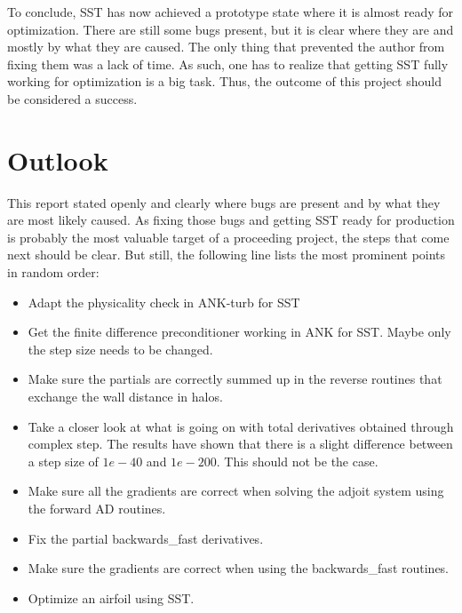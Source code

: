 To conclude, SST has now achieved a prototype state where it is almost ready
for optimization. There are still some bugs present, but it is clear where they
are and mostly by what they are caused. The only thing that prevented the
author from fixing them was a lack of time. As such, one has to realize that
getting SST fully working for optimization is a big task. Thus, the outcome of
this project should be considered a success.



\section{Outlook}
This report stated openly and clearly where bugs are present and by what they
are most likely caused. As fixing those bugs and getting SST ready for
production is probably the most valuable target of a proceeding project, the
steps that come next should be clear. But still, the following line lists the
most prominent points in random order:

\begin{itemize}
    \item Adapt the physicality check in ANK-turb for SST

    \item Get the finite difference preconditioner working in ANK for SST.
        Maybe only the step size needs to be changed.

    \item Make sure the partials are correctly summed up in the reverse
        routines that exchange the wall distance in halos.

    \item Take a closer look at what is going on with total derivatives
        obtained through complex step. The results have shown that there is a
        slight difference between a step size of $1e-40$ and $1e-200$. This
        should not be the case.
        
    \item Make sure all the gradients are correct when solving the adjoit system
        using the forward AD routines.

    \item Fix the partial backwards\_fast derivatives.

    \item Make sure the gradients are correct when using the backwards\_fast
        routines.

    \item Optimize an airfoil using SST.
\end{itemize}

